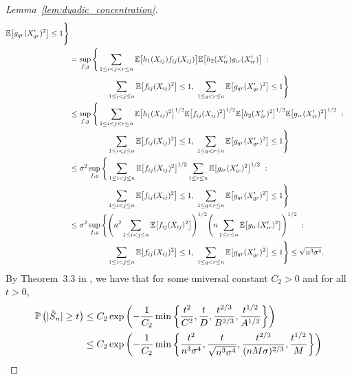 \begin{proof}[Lemma~\ref{lem:dyadic_concentration}]
\begin{align*}
      \E\big[g_{qr}(X'_{qr})^2\big]
      \leq 1
    \Bigg\} \\
    &=
    \sup_{f,g} \Bigg\{
      \sum_{1 \leq i < j < r \leq n}
      \E\big[
        h_1(X_{i j})
        f_{i j}(X_{i j})
      \big]
      \E\big[
        h_2(X'_{i r})
        g_{i r}(X'_{i r})
      \big]
      \ : \\
      &\qquad\qquad\quad
      \sum_{1 \leq i < j \leq n}
      \E\big[f_{i j}(X_{i j})^2\big]
      \leq 1, \
      \sum_{1 \leq q < r \leq n}
      \E\big[g_{qr}(X'_{qr})^2\big]
      \leq 1
    \Bigg\} \\
    &\leq
    \sup_{f,g} \Bigg\{
      \sum_{1 \leq i < j < r \leq n}
      \E\big[ h_1(X_{i j})^2 \big]^{1/2}
      \E\big[ f_{i j}(X_{i j})^2 \big]^{1/2}
      \E\big[ h_2(X_{i r}')^2 \big]^{1/2}
      \E\big[ g_{i r}(X'_{i r})^2 \big]^{1/2}
      \ : \\
      &\qquad\qquad\quad
      \sum_{1 \leq i < j \leq n}
      \E\big[f_{i j}(X_{i j})^2\big]
      \leq 1, \
      \sum_{1 \leq q < r \leq n}
      \E\big[g_{qr}(X'_{qr})^2\big]
      \leq 1
    \Bigg\} \\
    &\leq
    \sigma^2
    \sup_{f,g} \Bigg\{
      \sum_{1 \leq i < j \leq n}
      \E\big[ f_{i j}(X_{i j})^2 \big]^{1/2}
      \sum_{1 \leq r \leq n }
      \E\big[ g_{i r}(X'_{i r})^2 \big]^{1/2}
      \ : \\
      &\qquad\qquad\quad
      \sum_{1 \leq i < j \leq n}
      \E\big[f_{i j}(X_{i j})^2\big]
      \leq 1, \
      \sum_{1 \leq q < r \leq n}
      \E\big[g_{qr}(X'_{qr})^2\big]
      \leq 1
    \Bigg\} \\
    &\leq
    \sigma^2
    \sup_{f,g} \Bigg\{
      \Bigg(
        n^2
        \sum_{1 \leq i < j \leq n}
        \E\big[ f_{i j}(X_{i j})^2 \big]
      \Bigg)^{1/2}
      \Bigg(
        n
        \sum_{1 \leq r \leq n }
        \E\big[ g_{i r}(X'_{i r})^2 \big]
      \Bigg)^{1/2}
      \ : \\
      &\qquad\qquad\quad
      \sum_{1 \leq i < j \leq n}
      \E\big[f_{i j}(X_{i j})^2\big]
      \leq 1, \
      \sum_{1 \leq q < r \leq n}
      \E\big[g_{qr}(X'_{qr})^2\big]
      \leq 1
    \Bigg\}
    \leq
    \sqrt{n^3 \sigma^4}.
  \end{align*}
  \endgroup
  By Theorem~3.3 in
  \citet{gine2000exponential},
  we have that for some universal constant
  $C_2 > 0$
  and for all $t > 0$,
  \begin{align*}
    \P\left(
      |\tilde S_n| \geq t
    \right)
    &\leq
    C_2 \exp\left(
      -\frac{1}{C_2}
      \min \left\{
        \frac{t^2}{C^2},
        \frac{t}{D},
        \frac{t^{2/3}}{B^{2/3}},
        \frac{t^{1/2}}{A^{1/2}}
      \right\}
    \right) \\
    &\leq
    C_2 \exp\left(
      -\frac{1}{C_2}
      \min \left\{
        \frac{t^2}{n^3 \sigma^4},
        \frac{t}{\sqrt{n^3 \sigma^4}},
        \frac{t^{2/3}}{(n M \sigma)^{2/3}},
        \frac{t^{1/2}}{M}
      \right\}
    \right)
  \end{align*}


\end{proof}
